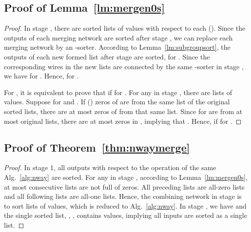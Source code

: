 \documentclass[10pt,journal,cspaper,compsoc]{IEEEtran}
\begin{document}
\subsection{Proof of Lemma~\ref{lm:mergen0s}}
\label{pf:mergen0s}
\begin{proof}
  In stage , there are  sorted lists of  values with respect to each  ().
  Since the outputs of each merging network are sorted after stage , we can replace each merging network by an -sorter.
  According to Lemma~\ref{lm:subgroupsort}, the outputs of each new formed list after stage  are sorted,  for .
  Since the corresponding wires in the new lists are connected by the same -sorter in stage , we have  for . Hence,  for .

  For , it is equivalent to prove that  if  for .
  For any  in stage , there are  lists of  values. Suppose  for  and .
  If  () zeros of  are from the same list of the original  sorted lists, there are at most  zeros of  from that same list. Since  for  are from at most  original lists, there are at most  zeros in , implying that .
  Hence,  if  for .
\end{proof}

\subsection{Proof of Theorem~\ref{thm:nwaymerge}}
\label{pf:nwaymerge}
\begin{proof}
  In stage 1, all outputs with respect to the operation of the same Alg.~\ref{alg:nway} are sorted.
  For any  in stage , according to Lemma~\ref{lm:mergen0s}, at most  consecutive lists are not full of zeros. All preceding lists are all-zero lists and all following lists are all-one lists.
  Hence, the combining network in stage  is to sort  lists of  values, which is reduced to Alg.~\ref{alg:nway}. In stage , we have  and the single sorted list,  , , contains  values, implying all inputs are sorted as a single list.
\end{proof}




\end{document}
